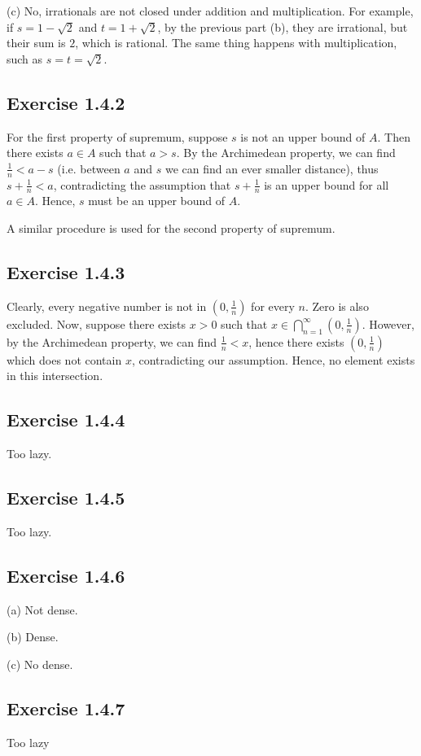 \documentclass{book}
\begin{document}
\noindent
(c)
No, irrationals are not closed under addition and multiplication. For example, if $s = 1 - \sqrt{2}$ and $t = 1 + \sqrt{2}$, by the previous part (b), they are irrational, but their sum is $2$, which is rational. The same thing happens with multiplication, such as $s = t = \sqrt{2}$.

\subsection*{Exercise 1.4.2}
For the first property of supremum, suppose $s$ is not an upper bound of $A$. Then there exists $a \in A$ such that $a > s$. By the Archimedean property, we can find $\frac{1}{n} < a - s$ (i.e. between $a$ and $s$ we can find an ever smaller distance), thus $s + \frac{1}{n} < a$, contradicting the assumption that $s + \frac{1}{n}$ is an upper bound for all $a \in A$. Hence, $s$ must be an upper bound of $A$.

A similar procedure is used for the second property of supremum.

\subsection*{Exercise 1.4.3}
Clearly, every negative number is not in $(0, \frac{1}{n})$ for every $n$. Zero is also excluded. Now, suppose there exists $x > 0$ such that $x \in \bigcap_{n = 1}^\infty (0, \frac{1}{n})$. However, by the Archimedean property, we can find $\frac{1}{n} < x$, hence there exists $(0, \frac{1}{n})$ which does not contain $x$, contradicting our assumption. Hence, no element exists in this intersection.

\subsection*{Exercise 1.4.4}
Too lazy.

\subsection*{Exercise 1.4.5}
Too lazy.

\subsection*{Exercise 1.4.6}
(a)
Not dense.

\noindent
(b)
Dense.

\noindent
(c)
No dense.

\subsection*{Exercise 1.4.7}
Too lazy
\end{document}
